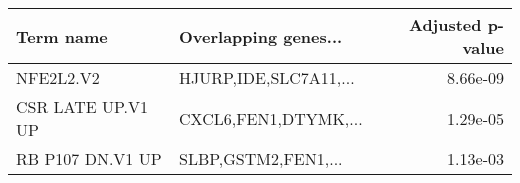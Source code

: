 \begin{tabular}{llr}
\toprule
        Term name &  Overlapping genes... &  Adjusted p-value \\
\midrule
        NFE2L2.V2 & HJURP,IDE,SLC7A11,... &          8.66e-09 \\
CSR LATE UP.V1 UP &  CXCL6,FEN1,DTYMK,... &          1.29e-05 \\
 RB P107 DN.V1 UP &   SLBP,GSTM2,FEN1,... &          1.13e-03 \\
\bottomrule
\end{tabular}
